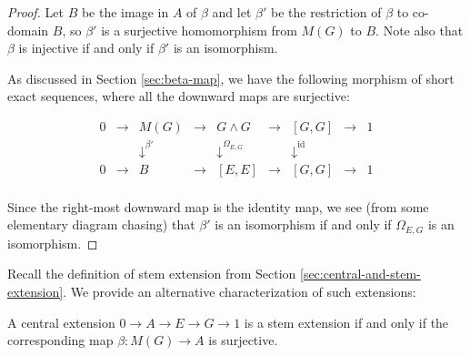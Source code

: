 \documentclass{ucetd}
\begin{document}
\begin{proof}
  Let $B$ be the image in $A$ of $\beta$ and let $\beta'$ be the
  restriction of $\beta$ to co-domain $B$, so $\beta'$ is a surjective
  homomorphism from $M(G)$ to $B$. Note also that $\beta$ is injective
  if and only if $\beta'$ is an isomorphism.

  As discussed in Section \ref{sec:beta-map}, we have the following
  morphism of short exact sequences, where all the downward maps are
  surjective:

  $$\begin{array}{ccccccccc}
    0 & \to & M(G) & \to & G \wedge G & \to & [G,G] & \to & 1\\
    &&   \downarrow^{\beta'}  &&  \downarrow^{\Omega_{E,G}}     && \downarrow^{\text{id}} && \\
    0 & \to & B &\to & [E,E] & \to & [G,G] & \to & 1\\
  \end{array}$$
  
  Since the right-most downward map is the identity map, we see (from
  some elementary diagram chasing) that $\beta'$ is an isomorphism if
  and only if $\Omega_{E,G}$ is an isomorphism. 
\end{proof}

Recall the definition of stem extension from Section
\ref{sec:central-and-stem-extension}. We provide an alternative
characterization of such extensions:

\begin{lemma}\label{lemma:stem-beta-surjective}
  A central extension $0 \to A \to E \to G \to 1$ is a stem extension
  if and only if the corresponding map $\beta: M(G) \to A$ is
  surjective.
\end{lemma}
\end{document}
